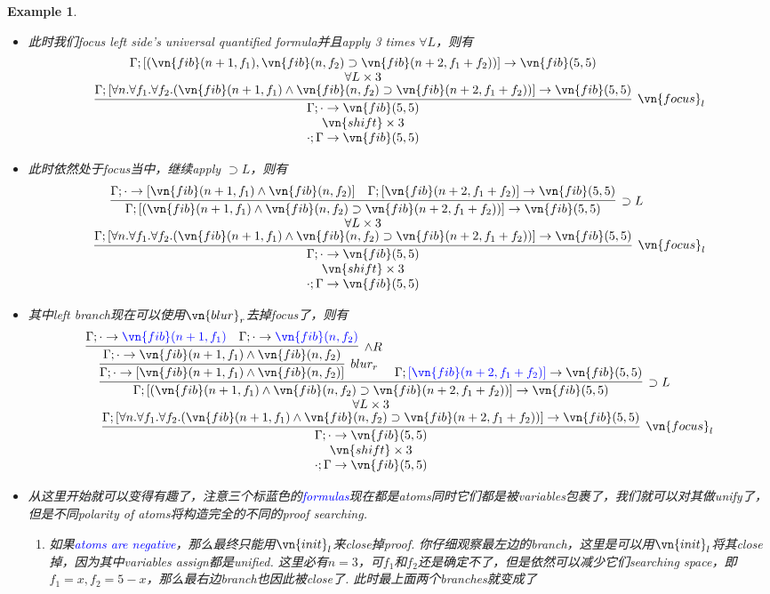 \documentclass{article}
\theoremstyle{plain}
\newtheorem{example}[theorem]{Example}
\theoremstyle{nonumberplain}
\newcommand{\bluet}[1]{\textcolor{blue}{#1}}
\begin{document}
\begin{example}
\begin{itemize}
\begin{enumerate}
	\end{enumerate}
	\item 此时我们focus left side's universal quantified formula并且apply 3 times $\forall L$，则有
	$$
	\deduce{\cdot;\Gamma \to \vn{fib}(5,5)}{\deduce{\vn{shift} \times 3}{\infer[\vn{focus}_l]{\Gamma;\cdot \to \vn{fib}(5,5)}{\deduce{\Gamma;[\forall n.\forall f_1.\forall f_2.(\vn{fib}(n+1,f_1)\wedge\vn{fib}(n,f_2) \supset \vn{fib}(n+2,f_1+f_2))] \to \vn{fib}(5,5)}{\deduce{\forall L \times 3}{\Gamma;[(\vn{fib}(n+1,f_1),\vn{fib}(n,f_2) \supset \vn{fib}(n+2,f_1+f_2))] \to \vn{fib}(5,5)}}}}}
	$$
	\item 此时依然处于focus当中，继续apply $\supset L$，则有
	$$
	\deduce{\cdot;\Gamma \to \vn{fib}(5,5)}{\deduce{\vn{shift} \times 3}{\infer[\vn{focus}_l]{\Gamma;\cdot \to \vn{fib}(5,5)}{\deduce{\Gamma;[\forall n.\forall f_1.\forall f_2.(\vn{fib}(n+1,f_1)\wedge\vn{fib}(n,f_2) \supset \vn{fib}(n+2,f_1+f_2))] \to \vn{fib}(5,5)}{\deduce{\forall L \times 3}{\infer[\supset L]{\Gamma;[(\vn{fib}(n+1,f_1)\wedge\vn{fib}(n,f_2) \supset \vn{fib}(n+2,f_1+f_2))] \to \vn{fib}(5,5)}{\Gamma;\cdot \to [\vn{fib}(n+1,f_1) \wedge \vn{fib}(n, f_2)]  &  \Gamma; [\vn{fib}(n+2, f_1 + f_2)] \to \vn{fib}(5,5)  }}}}}}
	$$
	\item 其中left branch现在可以使用$\vn{blur}_r$去掉focus了，则有
	$$
	\deduce{\cdot;\Gamma \to \vn{fib}(5,5)}{\deduce{\vn{shift} \times 3}{\infer[\vn{focus}_l]{\Gamma;\cdot \to \vn{fib}(5,5)}{\deduce{\Gamma;[\forall n.\forall f_1.\forall f_2.(\vn{fib}(n+1,f_1)\wedge\vn{fib}(n,f_2) \supset \vn{fib}(n+2,f_1+f_2))] \to \vn{fib}(5,5)}{\deduce{\forall L \times 3}{\infer[\supset L]{\Gamma;[(\vn{fib}(n+1,f_1)\wedge\vn{fib}(n,f_2) \supset \vn{fib}(n+2,f_1+f_2))] \to \vn{fib}(5,5)}{\infer[blur_r]{\Gamma;\cdot \to [\vn{fib}(n+1,f_1) \wedge \vn{fib}(n, f_2)]}{\infer[\wedge R]{\Gamma;\cdot \to \vn{fib}(n+1,f_1) \wedge \vn{fib}(n, f_2)}{\Gamma;\cdot \to \bluet{\vn{fib}(n+1,f_1)} & \Gamma;\cdot \to  \bluet{\vn{fib}(n, f_2)}}}  &  \Gamma; \bluet{[\vn{fib}(n+2, f_1 + f_2)]} \to \vn{fib}(5,5)  }}}}}}
	$$
	\item 从这里开始就可以变得有趣了，注意三个标蓝色的\bluet{formulas}现在都是atoms同时它们都是被variables包裹了，我们就可以对其做unify了，但是不同polarity of atoms将构造完全的不同的proof searching. 
	\begin{enumerate}
		\item 如果\bluet{atoms are negative}，那么最终只能用$\vn{init}_l$来close掉proof. 你仔细观察最左边的branch，这里是可以用$\vn{init}_l$将其close掉，因为其中variables assign都是unified. 这里必有$n = 3$，可$f_1$和$f_2$还是确定不了，但是依然可以减少它们searching space，即$f_1 = x, f_2 = 5-x$，那么最右边branch也因此被close了. 此时最上面两个branches就变成了

\end{enumerate}
\end{itemize}
\end{example}
\end{document}
